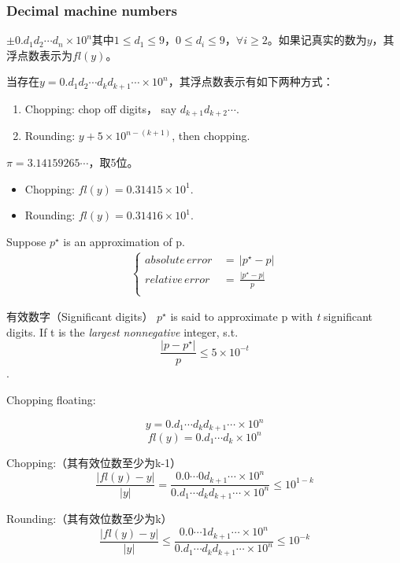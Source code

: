 \subsubsection{Decimal machine numbers}
$\pm 0.d_1d_2\cdots d_n \times 10^n$其中$1\leq d_1\leq 9$，$0\leq d_i\leq 9$，$\forall i\geq 2$。如果记真实的数为$y$，其浮点数表示为$fl(y)$。\par
当存在$y=0.d_1d_2\cdots d_kd_{k+1}\cdots\times 10^n$，其浮点数表示有如下两种方式：
\begin{enumerate}
    \item Chopping: chop off digits， say $d_{k+1}d_{k+2}\cdots$.
    \item Rounding: $y+5\times 10^{n-(k+1)}$, then chopping.
\end{enumerate}
\begin{example}
$\pi=3.14159265\cdots$，取5位。\par
    \begin{itemize}
      \item Chopping: $fl(y)=0.31415\times 10^1$.
      \item Rounding: $fl(y)=0.31416\times 10^1$.
    \end{itemize}
\end{example}\par
\begin{defn}{ }
Suppose $p^\star$ is an approximation of p.
\begin{align*}
    \begin{cases}
        absolute\,error\,&=\,\left|p^\star-p\right| \\
        relative\,error\,&=\,\frac{\left|p^\star-p\right|}{p} \\
    \end{cases}
\end{align*}
\end{defn}

\begin{defn}{有效数字（Significant digits）}
$p^\star$ is said to approximate p with \emph{t} significant digits. If t is the \emph{largest nonnegative} integer, s.t. $$\frac{\left|p-p^\star\right|}{p}\leq 5\times 10^{-t}$$.
\end{defn}\par
Chopping floating:\par
$$y=0.d_1\cdots d_kd_{k+1}\cdots\times 10^n$$
$$fl(y) = 0.d_1\cdots d_k\times 10^n$$\par
Chopping:（其有效位数至少为k-1）
$$
\frac{\left|fl(y)-y\right|}{\left|y\right|} = \frac{0.0\cdots 0d_{k+1}\cdots\times 10^n}{0.d_1\cdots d_kd_{k+1}\cdots\times 10^n} \leq 10^{1-k}
$$\par
Rounding:（其有效位数至少为k）
$$
\frac{\left|fl(y)-y\right|}{\left|y\right|} \leq \frac{0.0\cdots 1d_{k+1}\cdots\times 10^n}{0.d_1\cdots d_kd_{k+1}\cdots\times 10^n} \leq 10^{-k}
$$

